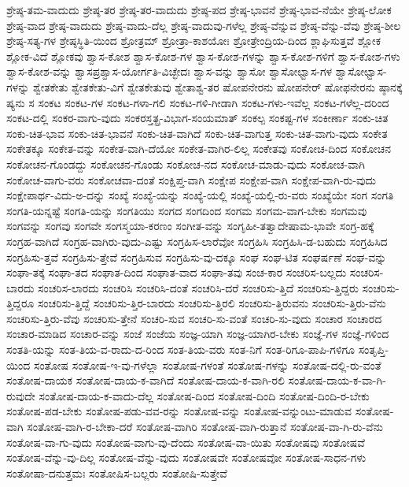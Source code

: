 {ಶ್ರೇಷ್ಠ-ತಮ-ವಾದುದು
ಶ್ರೇಷ್ಠ-ತರ
ಶ್ರೇಷ್ಠ-ತರ-ವಾದುದು
ಶ್ರೇಷ್ಠ-ಪದ
ಶ್ರೇಷ್ಠ-ಭಾವನೆ
ಶ್ರೇಷ್ಠ-ಭಾವ-ನೆಯೇ
ಶ್ರೇಷ್ಠ-ಲೋಕ
ಶ್ರೇಷ್ಠ-ವಾದ
ಶ್ರೇಷ್ಠ-ವಾದುದು
ಶ್ರೇಷ್ಠ-ವಾದು-ದೆಲ್ಲ
ಶ್ರೇಷ್ಠ-ವಾದುವು-ಗಳೆಲ್ಲ
ಶ್ರೇಷ್ಠ-ವೆನ್ನುವ
ಶ್ರೇಷ್ಠ-ವೆನ್ನು-ವೆವು
ಶ್ರೇಷ್ಠ-ಶೀಲ
ಶ್ರೇಷ್ಠ-ಸತ್ಯ-ಗಳ
ಶ್ರೇಷ್ಠಸ್ಥಿತಿ-ಯಿಂದ
ಶ್ರೋತ್ರಮ್
ಶ್ರೋತ್ರಾ-ಕಾಶಯೋಃ
ಶ್ರೋತ್ರೇಂದ್ರಿಯ-ದಿಂದ
ಶ್ಲಾಘಿಸುತ್ತವೆ
ಶ್ಲೋಕ
ಶ್ಲೋಕ-ವಿದೆ
ಶ್ಲೋಕವು
ಶ್ವಾಸ-ಕೋಶ
ಶ್ವಾಸ-ಕೋಶ-ಗಳ
ಶ್ವಾಸ-ಕೋಶ-ಗಳನ್ನು
ಶ್ವಾಸ-ಕೋಶ-ಗಳಿಗೆ
ಶ್ವಾಸ-ಕೋಶ-ಗಳು
ಶ್ವಾಸ-ಕೋಶ-ವನ್ನು
ಶ್ವಾಸಪ್ರಶ್ವಾಸ-ಯೋರ್ಗತಿ-ವಿಚ್ಛೇದಃ
ಶ್ವಾಸ-ವನ್ನು
ಶ್ವಾಸೋ
ಶ್ವಾಸೋಛ್ವಾಸ-ಗಳ
ಶ್ವಾಸೋಛ್ವಾಸ-ಗಳನ್ನು
ಶ್ವೇತಕೇತು
ಶ್ವೇತಕೇತು-ವಿಗೆ
ಶ್ವೇತಕೇತುವು
ಶ್ವೇತಾಶ್ವ-ತರ
ಷೋಪನೇರನು
ಷೋಪನೇರ್
ಷೋಫನೇರನು
ಷ್ಠಾನಕ್ಕೆ
ಷ್ಯನು
ಸ
ಸಂಕಟ
ಸಂಕಟ-ಗಳ
ಸಂಕಟ-ಗಳಾ-ಗಲಿ
ಸಂಕಟ-ಗಳಿ-ಗೀಡಾಗಿ
ಸಂಕಟ-ಗಳು-ಇವೆಲ್ಲ
ಸಂಕಟ-ಗಳೆಲ್ಲ-ದರಿಂದ
ಸಂಕಟ-ದಲ್ಲಿ
ಸಂಕರ-ವಾಗು-ವುದು
ಸಂಕರಸ್ತತ್ಪ್ರ-ವಿಭಾಗ-ಸಂಯಮಾತ್
ಸಂಕಲ್ಪ
ಸಂಕಷ್ಟ-ಗಳ
ಸಂಕೀರ್ಣಾ
ಸಂಕು-ಚಿತ
ಸಂಕು-ಚಿತ-ಭಾವ
ಸಂಕು-ಚಿತ-ಭಾವನೆ
ಸಂಕು-ಚಿತ-ವಾಗಿದೆ
ಸಂಕು-ಚಿತ-ವಾಗುತ್ತ
ಸಂಕು-ಚಿತ-ವಾಗು-ವುದು
ಸಂಕೇತ
ಸಂಕೇತಕ್ಕೂ
ಸಂಕೇತ-ವನ್ನು
ಸಂಕೇತ-ವಾಗಿ-ದೆಯೋ
ಸಂಕೇತ-ವಾಗಿರ-ಲಿಲ್ಲ
ಸಂಕೇತವು
ಸಂಕೋಚ-ದಿಂದ
ಸಂಕೋಚನ
ಸಂಕೋಚನ-ಗೊಂಡದ್ದು
ಸಂಕೋಚನ-ಗೊಂಡು
ಸಂಕೋಚ-ನದ
ಸಂಕೋಚ-ಮಾಡು-ವುದು
ಸಂಕೋಚ-ವಾಗಿ
ಸಂಕೋಚ-ವಾಗು-ವರು
ಸಂಕೋಚವಾ-ದಂತೆ
ಸಂಕ್ಷಿಪ್ತ-ವಾಗಿ
ಸಂಕ್ಷೇಪ
ಸಂಕ್ಷೇಪ-ವಾಗಿ
ಸಂಕ್ಷೇಪ-ವಾಗಿ-ರು-ವುದು
ಸಂಕ್ಷೇಪಾರ್ಥ-ವಿದು-ಅ-ದನ್ನು
ಸಂಖ್ಯೆ
ಸಂಖ್ಯೆ-ಯನ್ನು
ಸಂಖ್ಯೆ-ಯಲ್ಲಿ
ಸಂಖ್ಯೆ-ಯಲ್ಲಿ-ರು-ವರು
ಸಂಖ್ಯೆಯೇ
ಸಂಗ
ಸಂಗತಿ
ಸಂಗತಿ-ಯನ್ನಷ್ಟೆ
ಸಂಗತಿ-ಯನ್ನು
ಸಂಗತಿಯು
ಸಂಗದ
ಸಂಗದಿಂದ
ಸಂಗಮ
ಸಂಗಮ-ವಾಗ-ಬೇಕು
ಸಂಗಮವು
ಸಂಗವನ್ನು
ಸಂಗವು
ಸಂಗವೇ
ಸಂಗಸ್ಮಯಾ-ಕರಣಂ
ಸಂಗೀತ-ವನ್ನು
ಸಂಗೃಹೀ-ತತ್ವಾದೇಷಾಮ-ಭಾವೇ
ಸಂಗ್ರ-ಹಕ್ಕೆ
ಸಂಗ್ರಹ-ವಾಗಿದೆ
ಸಂಗ್ರಹ-ವಾಗಿರು-ವುದು-ಎಷ್ಟು
ಸಂಗ್ರಹಿಸ-ಲಾರೆವೋ
ಸಂಗ್ರಹಿಸಿ
ಸಂಗ್ರಹಿಸಿ-ಡ-ಬಹುದು
ಸಂಗ್ರಹಿಸಿದ
ಸಂಗ್ರಹಿಸು-ತ್ತವೆ
ಸಂಗ್ರಹಿಸು-ತ್ತೇವೆ
ಸಂಗ್ರಹಿಸುವ
ಸಂಗ್ರಹಿಸು-ವು-ದಕ್ಕೂ
ಸಂಘ
ಸಂಘ-ಟಿತ
ಸಂಘರ್ಷಣೆ
ಸಂಘ-ವನ್ನು
ಸಂಘಾ-ತಕ್ಕೆ
ಸಂಘಾ-ತದ
ಸಂಘಾತ-ದಿಂದ
ಸಂಘಾತ-ವಾದ
ಸಂಘಾ-ತವು
ಸಂಚ-ಕಾರ
ಸಂಚರಿಸ-ಬಲ್ಲದು
ಸಂಚರಿಸ-ಬಾರದು
ಸಂಚರಿಸ-ಲಾರದು
ಸಂಚರಿಸಿ
ಸಂಚರಿಸಿ-ದಂತೆ
ಸಂಚರಿಸಿ-ದರೆ
ಸಂಚರಿಸು-ತ್ತಿದೆ
ಸಂಚರಿಸು-ತ್ತಿದ್ದರು
ಸಂಚರಿಸು-ತ್ತಿದ್ದರೂ
ಸಂಚರಿಸು-ತ್ತಿದ್ದೆ
ಸಂಚರಿಸು-ತ್ತಿರ-ಬಾರದು
ಸಂಚರಿಸು-ತ್ತಿರಲಿ
ಸಂಚರಿಸು-ತ್ತಿರುವನು
ಸಂಚರಿಸು-ತ್ತಿರು-ವೆನು
ಸಂಚರಿಸು-ತ್ತಿರು-ವೆವು
ಸಂಚರಿಸು-ತ್ತೇನೆ
ಸಂಚರಿ-ಸುವ
ಸಂಚರಿ-ಸು-ವಂತೆ
ಸಂಚರಿ-ಸು-ವುದು
ಸಂಚಾರ
ಸಂಚಾರದ
ಸಂಚಾರ-ಮಾಡಿದ
ಸಂಚಾರ-ವನ್ನು
ಸಂಜೆ
ಸಂಜೆಯ
ಸಂಜ್ಞ-ಯಾಗಿ
ಸಂಜ್ಞ-ಯಾಗಿರ-ಬೇಕು
ಸಂಜ್ಞೆ-ಗಳ
ಸಂಜ್ಞೆ-ಗಳಿಂದ
ಸಂತತಿ-ಯನ್ನು
ಸಂತ-ತಿಯ-ವ-ರಾದು-ದ-ರಿಂದ
ಸಂತ-ತಿಯ-ವರು
ಸಂತ-ನಿಗೆ
ಸಂತ-ರಿಗೂ-ಪಾಪಿ-ಗಳಿಗೂ
ಸಂತೃಪ್ತಿ-ಯಿಂದ
ಸಂತೋಷ
ಸಂತೋಷ-ಇ-ವು-ಗಳೆಲ್ಲಾ
ಸಂತೋಷ-ಗಳಂತೆ
ಸಂತೋಷ-ಗಳನ್ನು
ಸಂತೋಷ-ದಲ್ಲಿ-ರು-ವಂತೆ
ಸಂತೋಷ-ದಾಯಕ
ಸಂತೋಷ-ದಾಯ-ಕ-ವಾಗಿದೆ
ಸಂತೋಷ-ದಾಯ-ಕ-ವಾಗಿ-ರಲಿ
ಸಂತೋಷ-ದಾಯ-ಕ-ವಾ-ಗಿ-ರುವುದೇ
ಸಂತೋಷ-ದಾಯ-ಕ-ವಾದು-ದೆಲ್ಲ
ಸಂತೋಷ-ದಿಂದ
ಸಂತೋಷ-ದಿಂದಿ
ಸಂತೋಷ-ದಿಂದಿ-ರ-ಬೇಕು
ಸಂತೋಷ-ಪಡ-ಬೇಕು
ಸಂತೋಷ-ಪಡು-ವವ-ರನ್ನು
ಸಂತೋಷ-ವನ್ನು
ಸಂತೋಷ-ವನ್ನುಂಟು-ಮಾಡುವ
ಸಂತೋಷ-ವಾಗಿ
ಸಂತೋಷ-ವಾಗಿ-ರ-ಬೇಕಾ-ದರೆ
ಸಂತೋಷ-ವಾಗಿರಿ
ಸಂತೋಷ-ವಾಗಿ-ರುತ್ತಾನೆ
ಸಂತೋಷ-ವಾ-ಗಿ-ರು-ವೆನು
ಸಂತೋಷ-ವಾ-ಗು-ವುದು
ಸಂತೋಷ-ವಾಗು-ವು-ದೆಂದು
ಸಂತೋಷ-ವಾ-ಯಿತು
ಸಂತೋಷವು
ಸಂತೋಷವೆ
ಸಂತೋಷ-ವೆನ್ನು-ವು-ದಿಲ್ಲ
ಸಂತೋಷ-ವೆನ್ನು-ವುದು
ಸಂತೋಷವೇ
ಸಂತೋಷವೋ
ಸಂತೋಷ-ಸಾಧನ-ಗಳು
ಸಂತೋಷಾ-ದನುತ್ತಮಃ
ಸಂತೋಷಿಸ-ಬಲ್ಲರು
ಸಂತೋಷಿ-ಸುತ್ತೇವೆ
}
